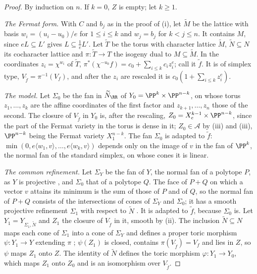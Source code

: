 \begin{proof}
By induction on $n$. If $k=0$, $Z$ is empty; let $k\ge1$.

\emph{The Fermat form.} With $C$ and $b_{j}$ as in the proof of
(i), let $\widetilde M$ be the lattice with basis
$w_{i}=(u_{i}-u_{0})/e$ for $1\le i\le k$ and $w_{j}=b_{j}$ for $k<j\le n$.
It contains $M$, since $eL\subseteq L'$ gives $L\subseteq\frac1eL'$. Let
$\widetilde T$ be the torus with character lattice $\widetilde M$,
$\widetilde N\subseteq N$ its cocharacter lattice and
$\pi\colon\widetilde T\to T$ the isogeny dual to $M\subseteq\widetilde M$.
In the coordinates $z_{i}=\chi^{w_{i}}$ of $\widetilde T$,
$\pi^{*}(\chi^{-u_{0}}f)=c_{0}+\sum_{i\le k}c_{i}z_{i}^{e}$; call it
$\widetilde f$. It is of simplex type, $V_{\widetilde f}=\pi^{-1}(V_{f})$,
and after the $z_{i}$ are rescaled it is $c_{0}(1+\sum_{i\le k}z_{i}^{e})$.

\emph{The model.} Let $\Sigma_{0}$ be the fan in $\widetilde N_{\RR}$ of
$Y_{0}=\PP^{k}\times\PP^{n-k}$, on whose torus $z_{1},\dots,z_{k}$ are the
affine coordinates of the first factor and $z_{k+1},\dots,z_{n}$ those of the
second. The closure of $V_{\widetilde f}$ in $Y_{0}$ is, after the
rescaling, $Z_{0}=X^{k-1}_{e}\times\PP^{n-k}$, since the part of the Fermat
variety in the torus is dense in it; $Z_{0}\in\mathcal{A}$ by
(iii) and (iii), $\PP^{n-k}$ being
the Fermat variety $X^{n-k}_{1}$. The fan $\Sigma_{0}$ is adapted to
$\widetilde f$: $\min(0,e\langle w_{1},v\rangle,\dots,e\langle
w_{k},v\rangle)$ depends only on the image of $v$ in the fan of $\PP^{k}$,
the normal fan of the standard simplex, on whose cones it is linear.

\emph{The common refinement.} Let $\Sigma_{Y}$ be the fan of $Y$, the normal
fan of a polytope $P$, as $Y$ is projective \cite[Chapter~2]{CLS11}, and
$\Sigma_{0}$ that of a polytope $Q$. The face of $P+Q$ on which a vector $v$
attains its minimum is the sum of those of $P$ and of $Q$, so the normal fan
of $P+Q$ consists of the intersections of cones of $\Sigma_{Y}$ and
$\Sigma_{0}$; it has a smooth projective refinement $\Sigma_{1}$ with
respect to $\widetilde N$ \cite[Chapter~11]{CLS11}. It is adapted to
$\widetilde f$, because $\Sigma_{0}$ is. Let
$Y_{1}=Y_{\Sigma_{1},\widetilde N}$ and $Z_{1}$ the closure of
$V_{\widetilde f}$ in it, smooth by (ii). The
inclusion $\widetilde N\subseteq N$ maps each cone of $\Sigma_{1}$ into a cone
of $\Sigma_{Y}$ and defines a proper toric morphism $\psi\colon Y_{1}\to Y$
extending $\pi$ \cite[Chapter~3]{CLS11}; $\psi(Z_{1})$ is closed, contains
$\pi(V_{\widetilde f})=V_{f}$ and lies in $Z$, so $\psi$ maps $Z_{1}$ onto
$Z$. The identity of $\widetilde N$ defines the toric morphism
$\varphi\colon Y_{1}\to Y_{0}$, which maps $Z_{1}$ onto $Z_{0}$ and is an
isomorphism over $V_{\widetilde f}$.


\end{proof}
